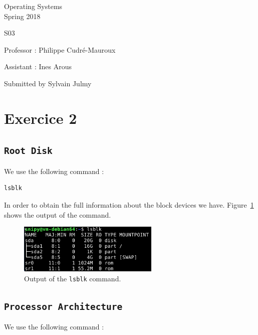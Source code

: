 \documentclass[a4paper,11pt]{report}
\author{Sylvain Julmy}
\date{\today}
\begin{document}
\begin{center}
  \Large{
    Operating Systems\\
    Spring 2018
  }
  
  \noindent\makebox[\linewidth]{\rule{\linewidth}{0.4pt}}
  S03
  \noindent\makebox[\linewidth]{\rule{\linewidth}{0.4pt}}

  \begin{flushleft}
    Professor : Philippe Cudré-Mauroux

    Assistant : Ines Arous
  \end{flushleft}
  
  \noindent\makebox[\linewidth]{\rule{\linewidth}{0.4pt}}

  Submitted by Sylvain Julmy
  
  \noindent\makebox[\linewidth]{\rule{\textwidth}{1pt}}
\end{center}

\section*{Exercice 2}

\subsection*{\texttt{Root Disk}}
We use the following command :

\begin{verbatim}
lsblk
\end{verbatim}

In order to obtain the full information about the block devices we have.
Figure~\ref{fig:root} shows the output of the command.

\begin{figure}[ht]
  \centering
  \includegraphics[width=0.6\textwidth]{figures/root_disk}
  \caption{\label{fig:root} Output of the \texttt{lsblk} command.}
\end{figure}

\subsection*{\texttt{Processor Architecture}}
We use the following command :
\end{document}
